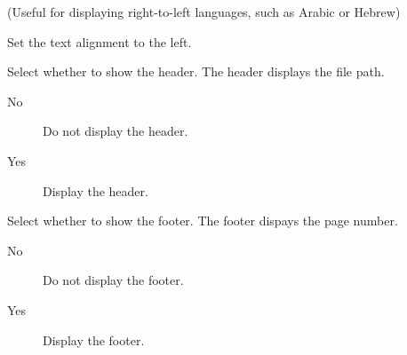 \begin{description}
\begin{description}
\begin{description}
            (Useful for displaying right-to-left languages, such as Arabic or Hebrew)
            \item[Left] Set the text alignment to the left.
        \end{description}
    \item[Show Header] Select whether to show the header. The header displays the file path.
        \begin{description}
            \item[No] Do not display the header.
            \item[Yes] Display the header.
        \end{description}
    \item[Show Footer] Select whether to show the footer. The footer dispays the page number.
        \begin{description}
            \item[No] Do not display the footer.
            \item[Yes] Display the footer.
        \end{description}


\end{description}
\end{description}
